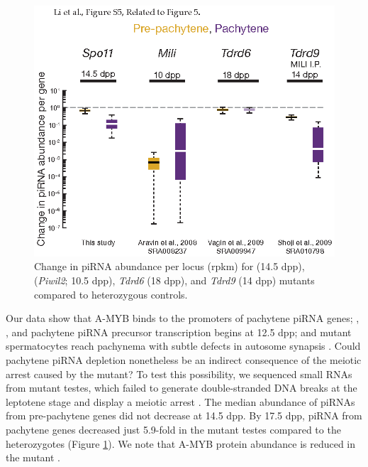     \begin{figure}[htbp] %
      \centering 
      \includegraphics{Figures/MolCel/MolCel2013_FigS5.eps}
      \caption[Change in piRNA Expression in \spo{}, \miwi{}, \textit{Tdrd6}, and \textit{Tdrd9} Mutants]
      {
      Change in piRNA abundance per locus (rpkm) for \spo{} (14.5 dpp), \miwi{} (\textit{Piwil2}; 10.5 dpp), \textit{Tdrd6} (18 dpp), and \textit{Tdrd9} (14 dpp) mutants compared to heterozygous controls.
      }
      \label{fig:MolCelS5}
 	   \end{figure}

    Our data show that A-MYB binds to the promoters of pachytene piRNA genes; \amyb{}, \miwi{}, and pachytene piRNA precursor transcription begins at 12.5 dpp; and \amyb{} mutant spermatocytes reach pachynema with subtle defects in autosome synapsis \citep{Bolcun-Filas2011}. Could pachytene piRNA depletion nonetheless be an indirect consequence of the meiotic arrest caused by the \amyb{} mutant? To test this possibility, we sequenced small RNAs from \spo{} mutant testes, which failed to generate double-stranded DNA breaks at the leptotene stage and display a meiotic arrest \citep{Baudat2000c,Romanienko2000}. The median abundance of piRNAs from pre-pachytene genes did not decrease at 14.5 dpp. By 17.5 dpp, piRNA from pachytene genes decreased just 5.9-fold in the \spo{} mutant testes compared to the heterozygotes (Figure \ref{fig:MolCelS5}). We note that A-MYB protein abundance is reduced in the \spo{} mutant \citep{Bolcun-Filas2011}.

